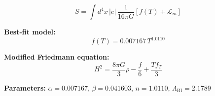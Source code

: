 
\begin{equation}
  S = \int d^4x \, |e| \, \frac{1}{16\pi G} \left[ f(T) + \mathcal{L}_m \right]
\end{equation}

\textbf{Best-fit model:}
\begin{equation}
  f(T) = 0.007167 \, T^{1.0110}
\end{equation}

\textbf{Modified Friedmann equation:}
\begin{equation}
  H^2 = \frac{8\pi G}{3} \rho - \frac{f}{6} + \frac{T f_T}{3}
\end{equation}

\textbf{Parameters:}
$\alpha = 0.007167$, \quad
$\beta = 0.041603$, \quad
$n = 1.0110$, \quad
$\Lambda_{\text{BI}} = 2.1789$